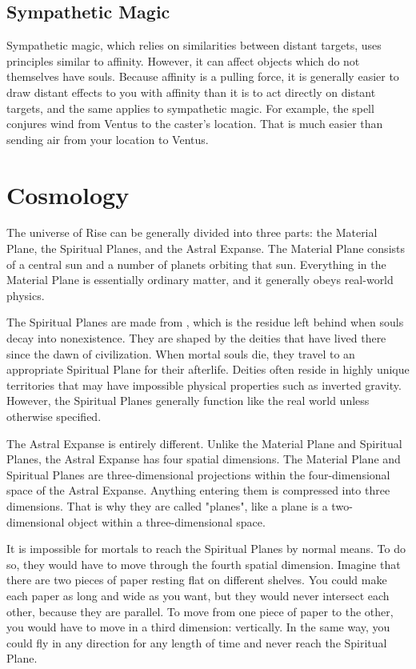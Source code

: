     \subsection{Sympathetic Magic}
      Sympathetic magic, which relies on similarities between distant targets, uses principles similar to affinity.
      However, it can affect objects which do not themselves have souls.
      Because affinity is a pulling force, it is generally easier to draw distant effects to you with affinity than it is to act directly on distant targets, and the same applies to sympathetic magic.
      For example, the  spell conjures wind from Ventus to the caster's location.
      That is much easier than sending air from your location to Ventus.

\section{Cosmology}\label{Cosmology}
  The universe of Rise can be generally divided into three parts: the Material Plane, the Spiritual Planes, and the Astral Expanse.
  The Material Plane consists of a central sun and a number of planets orbiting that sun.
  Everything in the Material Plane is essentially ordinary matter, and it generally obeys real-world physics.

  The Spiritual Planes are made from , which is the residue left behind when souls decay into nonexistence.
  They are shaped by the deities that have lived there since the dawn of civilization.
  When mortal souls die, they travel to an appropriate Spiritual Plane for their afterlife.
  Deities often reside in highly unique territories that may have impossible physical properties such as inverted gravity.
  However, the Spiritual Planes generally function like the real world unless otherwise specified.

  The Astral Expanse is entirely different.
  Unlike the Material Plane and Spiritual Planes, the Astral Expanse has four spatial dimensions.
  The Material Plane and Spiritual Planes are three-dimensional projections within the four-dimensional space of the Astral Expanse.
  Anything entering them is compressed into three dimensions.
  That is why they are called "planes", like a plane is a two-dimensional object within a three-dimensional space.

  It is impossible for mortals to reach the Spiritual Planes by normal means.
  To do so, they would have to move through the fourth spatial dimension.
  Imagine that there are two pieces of paper resting flat on different shelves.
  You could make each paper as long and wide as you want, but they would never intersect each other, because they are parallel.
  To move from one piece of paper to the other, you would have to move in a third dimension: vertically.
  In the same way, you could fly in any direction for any length of time and never reach the Spiritual Plane.

